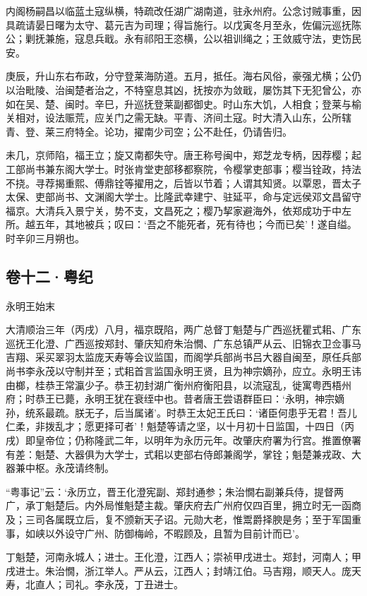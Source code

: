 \documentclass[]{article}
\begin{document}
内阁杨嗣昌以临蓝土寇纵横，特疏改任湖广湖南道，驻永州府。公念讨贼事重，因具疏请晏日曙为太守、葛元吉为司理；得旨施行。以戊寅冬月至永，佐偏沅巡抚陈公；剿抚兼施，寇息兵戢。永有祁阳王恣横，公以祖训绳之；王敛威守法，吏饬民安。

庚辰，升山东右布政，分守登莱海防道。五月，抵任。海右风俗，豪强尤横；公仍以治毗陵、治闽楚者治之，不特窒息其凶，抚按亦为敛戢，屡饬其下无犯曾公，亦如在吴、楚、闽时。辛巳，升巡抚登莱副都御史。时山东大饥，人相食；登莱与榆关相对，设法赈荒，应关门之需无缺。平青、济间土寇。时大清入山东，公所辖青、登、莱三府特全。论功，擢南少司空；公不赴任，仍请告归。

未几，京师陷，福王立；旋又南都失守。唐王称号闽中，郑芝龙专柄，因荐樱；起工部尚书兼东阁大学士。时张肯堂吏部移都察院，令樱掌吏部事；樱当铨政，持法不挠。寻荐揭重熙、傅鼎铨等擢用之，后皆以节着；人谓其知贤。以覃恩，晋太子太保、吏部尚书、文渊阁大学士。比隆武幸建宁、驻延平，命与定远侯邓文昌留守福京。大清兵入景宁关，势不支，文昌死之；樱乃挈家避海外，依郑成功于中左所。越五年，其地被兵；叹曰：`吾之不能死者，死有待也；今而已矣'！遂自缢。时辛卯三月朔也。

\hypertarget{header-n72}{%
\subsection{卷十二·粤纪}\label{header-n72}}

永明王始末

大清顺治三年（丙戌）八月，福京既陷，两广总督丁魁楚与广西巡抚瞿式耜、广东巡抚王化澄、广西巡按郑封、肇庆知府朱治憪、广东总镇严从云、旧锦衣卫佥事马吉翔、采买翠羽太监庞天寿等会议监国，而阁学兵部尚书吕大器自闽至，原任兵部尚书李永茂以守制并至；式耜首言监国永明王贤，且为神宗嫡孙，应立。永明王讳由榔，桂恭王常瀛少子。恭王初封湖广衡州府衡阳县，以流寇乱，徙寓粤西梧州府；时恭王已薨，永明王犹在衰绖中也。昔者唐王尝语群臣曰：`永明，神宗嫡孙，统系最疏。朕无子，后当属诸'。时恭王太妃王氏曰：`诸臣何患乎无君！吾儿仁柔，非拨乱才；愿更择可者'！魁楚等请之坚，以十月初十日监国，十四日（丙戌）即皇帝位；仍称隆武二年，以明年为永历元年。改肇庆府署为行宫。推置僚署有差：魁楚、大器俱为大学士，式耜以吏部右侍郎兼阁学，掌铨；魁楚兼戎政、大器兼中枢。永茂请终制。

``粤事记''云：`永历立，晋王化澄宪副、郑封通参；朱治憪右副兼兵侍，提督两广，承丁魁楚后。内外局惟魁楚主裁。肇庆府去广州府仅四百里，拥立时无一函商及；三司各属既立后，复不颁新天子诏。元勋大老，惟鬻爵择腴是务；至于军国重事，如峡以外设守广州、防御梅岭，不暇顾及，且暂为目前计而已'。

丁魁楚，河南永城人；进士。王化澄，江西人；崇祯甲戌进士。郑封，河南人；甲戌进士。朱治憪，浙江举人。严从云，江西人；封靖江伯。马吉翔，顺天人。庞天寿，北直人；司礼。李永茂，丁丑进士。
\end{document}
